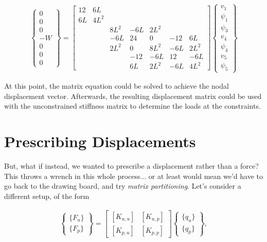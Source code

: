 \documentclass[10pt,letterpaper]{article}
\begin{document}
	\begin{align}
		\begin{Bmatrix}
			0 \\
			0 \\
			0 \\
			-W \\
			0 \\
			0 \\
			0
		\end{Bmatrix} = \begin{bmatrix}
12 & 6L & & & & & \\
6L & 4L^2 & & & & & \\
 & & 8L^2 & -6L & 2L^2 & & \\
 & & -6L & 24 & 0 & -12 & 6L \\
 & & 2L^2 & 0 & 8L^2 & -6L & 2L^2 \\
 & & & -12 & -6L & 12 & -6L \\
 & & & 6L & 2L^2 & -6L & 4L^2 
 		\end{bmatrix} \begin{Bmatrix}
			v_1 \\
			\psi_1 \\
			\psi_3 \\
			v_4 \\
			\psi_4 \\
			v_5 \\
			\psi_5
		\end{Bmatrix}
	\end{align}

	At this point, the matrix equation could be solved to achieve the nodal displacement vector. Afterwards, the resulting displacement matrix could be used with the unconstrained stiffness matrix to determine the loads at the constraints.

	\section{Prescribing Displacements}

	But, what if instead, we wanted to prescribe a displacement rather than a force? This throws a wrench in this whole process... or at least would mean we'd have to go back to the drawing board, and try \textit{matrix partitioning}. Let's consider a different setup, of the form

	\begin{align}
		\begin{Bmatrix}
			\{F_u\} \\
			\{F_p\} 
		\end{Bmatrix} = \begin{bmatrix}
			[K_{u,u}] & [K_{u,p}] \\
			[K_{p,u}] & [K_{p,p}] 
 		\end{bmatrix} \begin{Bmatrix}
			\{q_{u}\} \\
			\{q_{p}\} 
		\end{Bmatrix},
	\end{align}
\end{document}
